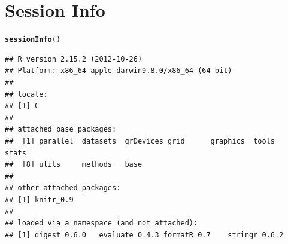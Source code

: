 \documentclass[12pt]{article}\usepackage{graphicx, color}
\makeatletter
\newcommand{\hlfunctioncall}[1]{\textcolor[rgb]{0.501960784313725,0,0.329411764705882}{\textbf{#1}}}%
\newenvironment{kframe}{%
 \def\at@end@of@kframe{}%
 \ifinner\ifhmode%
  \def\at@end@of@kframe{\end{minipage}}%
  \begin{minipage}{\columnwidth}%
 \fi\fi%
 \def\FrameCommand##1{\hskip\@totalleftmargin \hskip-\fboxsep
 \colorbox{shadecolor}{##1}\hskip-\fboxsep
     \hskip-\linewidth \hskip-\@totalleftmargin \hskip\columnwidth}%
 \MakeFramed {\advance\hsize-\width
   \@totalleftmargin\z@ \linewidth\hsize
   \@setminipage}}%
 {\par\unskip\endMakeFramed%
 \at@end@of@kframe}
\newenvironment{knitrout}{}{} %
\makeatother
\begin{document}
\pagebreak

\section*{Session Info}
\begin{knitrout}
\color{fgcolor}\begin{kframe}
\begin{alltt}
\hlfunctioncall{sessionInfo}()
\end{alltt}
\begin{verbatim}
## R version 2.15.2 (2012-10-26)
## Platform: x86_64-apple-darwin9.8.0/x86_64 (64-bit)
## 
## locale:
## [1] C
## 
## attached base packages:
##  [1] parallel  datasets  grDevices grid      graphics  tools     stats    
##  [8] utils     methods   base     
## 
## other attached packages:
## [1] knitr_0.9
## 
## loaded via a namespace (and not attached):
## [1] digest_0.6.0   evaluate_0.4.3 formatR_0.7    stringr_0.6.2
\end{verbatim}
\end{kframe}
\end{knitrout}





\printindex
\end{document}
